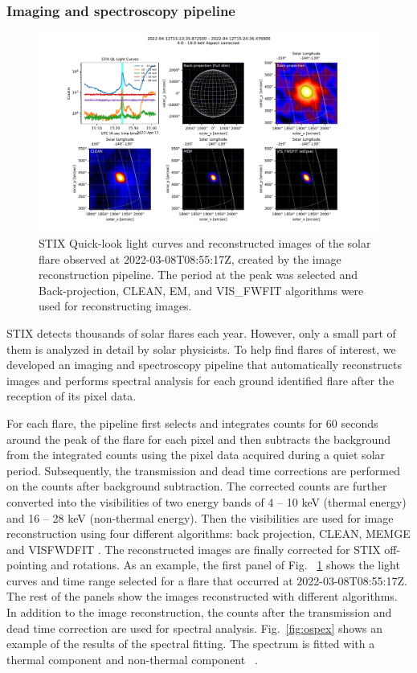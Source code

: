 \documentclass[referee]{aa} %
\begin{document}
\subsubsection{Imaging and spectroscopy pipeline}
\begin{figure}
  \centering
  \includegraphics[width=0.95\linewidth]{figures/imaging_pipeline.pdf}
  \caption{ 
   STIX Quick-look light curves and reconstructed images of the solar flare observed at 2022-03-08T08:55:17Z, 
   created by the image reconstruction pipeline.  The period at the peak was selected and 
   Back-projection, CLEAN, EM, and VIS\_FWFIT
    algorithms were used for reconstructing images. }
  \label{fig:imaging}
\end{figure}
STIX detects thousands of solar flares each year. However, only a small part of them is analyzed in detail by solar physicists. 
To help find flares of interest, we developed an imaging and spectroscopy pipeline that automatically reconstructs images and performs spectral analysis for each ground identified flare after the reception of its pixel data. 

 For each flare, the pipeline first selects and integrates counts for 60 seconds around the peak of the flare for each pixel and then subtracts the background from the integrated counts using the pixel data acquired during a quiet solar period. 
 Subsequently, the transmission and dead time corrections are performed on the counts after background subtraction. The corrected counts are further converted into the visibilities of two energy bands of 4 -- 10 keV (thermal energy) and 16 -- 28 keV (non-thermal energy). 
Then the visibilities are used for image reconstruction using four different algorithms: back projection, CLEAN, MEM\textunderscore GE and VIS\textunderscore FWDFIT \cite{paolo2022,clean,mem}.
The reconstructed images are finally corrected  for STIX off-pointing and rotations. 
As an example,  the first panel of Fig. ~\ref{fig:imaging} shows the light curves and time range selected for a flare that occurred at 2022-03-08T08:55:17Z.
The rest of the panels show the images reconstructed with different algorithms. 
In addition to the image reconstruction, the counts after the transmission and dead time correction are used for spectral analysis.  Fig.~\ref{fig:ospex} shows an example of the results of the spectral fitting. The spectrum is fitted with a thermal component and non-thermal component ~\cite{andrea2021}. 
\end{document}
